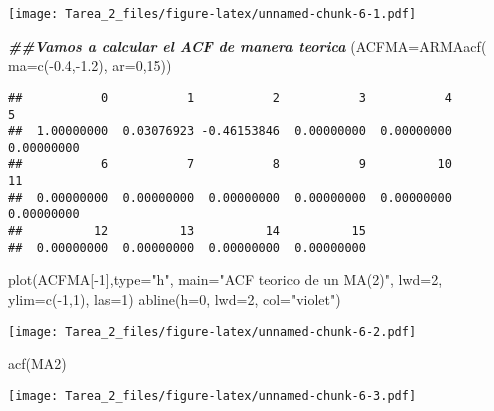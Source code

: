 \documentclass[
]{article}
\newenvironment{Shaded}{\begin{snugshade}}{\end{snugshade}}
\newcommand{\AttributeTok}[1]{\textcolor[rgb]{0.77,0.63,0.00}{#1}}
\newcommand{\DecValTok}[1]{\textcolor[rgb]{0.00,0.00,0.81}{#1}}
\newcommand{\DocumentationTok}[1]{\textcolor[rgb]{0.56,0.35,0.01}{\textbf{\textit{#1}}}}
\newcommand{\FloatTok}[1]{\textcolor[rgb]{0.00,0.00,0.81}{#1}}
\newcommand{\FunctionTok}[1]{\textcolor[rgb]{0.00,0.00,0.00}{#1}}
\newcommand{\NormalTok}[1]{#1}
\newcommand{\SpecialCharTok}[1]{\textcolor[rgb]{0.00,0.00,0.00}{#1}}
\newcommand{\StringTok}[1]{\textcolor[rgb]{0.31,0.60,0.02}{#1}}
\begin{document}
\texttt{[image: Tarea\_2\_files/figure-latex/unnamed-chunk-6-1.pdf]}

\begin{Shaded}
\begin{Highlighting}[]
\DocumentationTok{\#\#Vamos a calcular el ACF de manera teorica }
\NormalTok{(}\AttributeTok{ACFMA=}\FunctionTok{ARMAacf}\NormalTok{( }\AttributeTok{ma=}\FunctionTok{c}\NormalTok{(}\SpecialCharTok{{-}}\FloatTok{0.4}\NormalTok{,}\SpecialCharTok{{-}}\FloatTok{1.2}\NormalTok{), }\AttributeTok{ar=}\DecValTok{0}\NormalTok{,}\DecValTok{15}\NormalTok{))}
\end{Highlighting}
\end{Shaded}

\begin{verbatim}
##           0           1           2           3           4           5 
##  1.00000000  0.03076923 -0.46153846  0.00000000  0.00000000  0.00000000 
##           6           7           8           9          10          11 
##  0.00000000  0.00000000  0.00000000  0.00000000  0.00000000  0.00000000 
##          12          13          14          15 
##  0.00000000  0.00000000  0.00000000  0.00000000
\end{verbatim}

\begin{Shaded}
\begin{Highlighting}[]
\FunctionTok{plot}\NormalTok{(ACFMA[}\SpecialCharTok{{-}}\DecValTok{1}\NormalTok{],}\AttributeTok{type=}\StringTok{"h"}\NormalTok{, }\AttributeTok{main=}\StringTok{"ACF teorico de un MA(2)"}\NormalTok{, }\AttributeTok{lwd=}\DecValTok{2}\NormalTok{, }\AttributeTok{ylim=}\FunctionTok{c}\NormalTok{(}\SpecialCharTok{{-}}\DecValTok{1}\NormalTok{,}\DecValTok{1}\NormalTok{), }\AttributeTok{las=}\DecValTok{1}\NormalTok{)}
\FunctionTok{abline}\NormalTok{(}\AttributeTok{h=}\DecValTok{0}\NormalTok{, }\AttributeTok{lwd=}\DecValTok{2}\NormalTok{, }\AttributeTok{col=}\StringTok{"violet"}\NormalTok{)}
\end{Highlighting}
\end{Shaded}

\texttt{[image: Tarea\_2\_files/figure-latex/unnamed-chunk-6-2.pdf]}

\begin{Shaded}
\begin{Highlighting}[]
\FunctionTok{acf}\NormalTok{(MA2)}
\end{Highlighting}
\end{Shaded}

\texttt{[image: Tarea\_2\_files/figure-latex/unnamed-chunk-6-3.pdf]}
\end{document}
